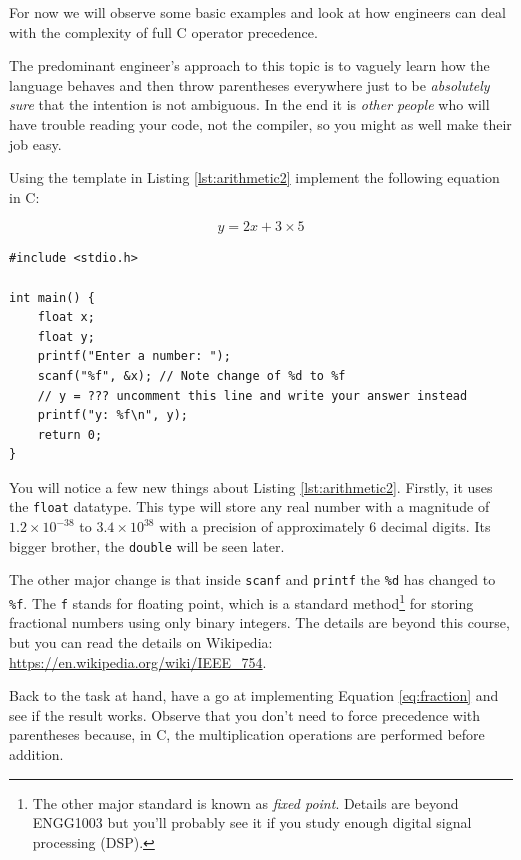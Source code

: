 \documentclass{lab}
\begin{document}
For now we will observe some basic examples and look at how engineers can deal with the complexity of full C operator precedence.

The predominant engineer's approach to this topic is to vaguely learn how the language behaves and then throw parentheses everywhere just to be \textit{absolutely sure} that the intention is not ambiguous. In the end it is \textit{other people} who will have trouble reading your code, not the compiler, so you might as well make their job easy.

\begin{task}{}{}
Using the template in Listing \ref{lst:arithmetic2} implement the following equation in C:

\begin{equation}\label{eq:fraction}
y = 2x+3\times5
\end{equation}



\begin{lstlisting}[style=CStyle,caption=A basic arithmetic example,label=lst:arithmetic2]
#include <stdio.h>

int main() {
	float x;
	float y;
	printf("Enter a number: ");
	scanf("%f", &x); // Note change of %d to %f
	// y = ??? uncomment this line and write your answer instead
	printf("y: %f\n", y);
	return 0;
}
\end{lstlisting}
\end{task}

You will notice a few new things about Listing \ref{lst:arithmetic2}. Firstly, it uses the \texttt{float} datatype. This type will store any real number with a magnitude of $1.2 \times 10^{-38}$ to $3.4 \times 10^{38}$ with a precision of approximately 6 decimal digits. Its bigger brother, the \texttt{double} will be seen later.

The other major change is that inside \texttt{scanf} and \texttt{printf} the \texttt{\%d} has changed to \texttt{\%f}. The \texttt{f} stands for floating point, which is a standard method\footnote{The other major standard is known as \textit{fixed point}. Details are beyond ENGG1003 but you'll probably see it if you study enough digital signal processing (DSP).} for storing fractional numbers using only binary integers. The details are beyond this course, but you can read the details on Wikipedia: \url{https://en.wikipedia.org/wiki/IEEE_754}.

Back to the task at hand, have a go at implementing Equation \ref{eq:fraction} and see if the result works. Observe that you don't need to force precedence with parentheses because, in C, the multiplication operations are performed before addition.
\end{document}
